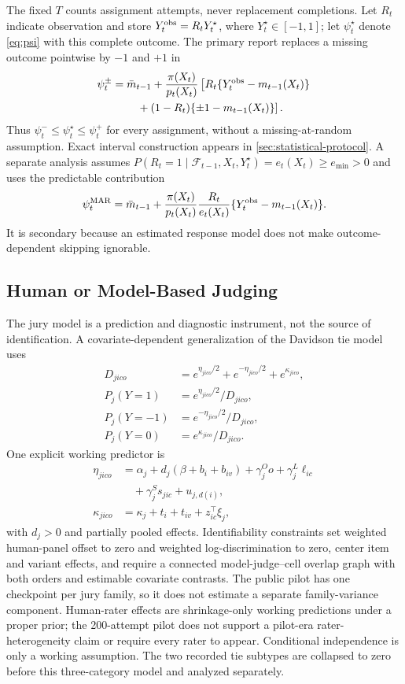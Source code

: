 \documentclass{article}
\begin{document}
The fixed $T$ counts assignment attempts, never replacement completions. Let
$R_t$ indicate observation and store $Y_t^{\rm obs}=R_tY_t^\star$, where
$Y_t^\star\in[-1,1]$; let $\psi_t^\star$ denote \cref{eq:psi} with this
complete outcome. The primary report replaces a missing outcome pointwise by
$-1$ and $+1$ in
\begin{align}
\psi_t^\pm
&=\bar m_{t-1}+\frac{\pi(X_t)}{p_t(X_t)}
\left[R_t\{Y_t^{\rm obs}-m_{t-1}(X_t)\}\right.\nonumber\\
&\qquad\left.{}+(1-R_t)\{\pm1-m_{t-1}(X_t)\}\right].
\end{align}
Thus $\psi_t^-\le\psi_t^\star\le\psi_t^+$ for every assignment, without a
missing-at-random assumption. Exact interval construction appears in
\cref{sec:statistical-protocol}. A separate analysis assumes
$P(R_t=1\mid\mathcal F_{t-1},X_t,Y_t^\star)=e_t(X_t)\ge e_{\min}>0$ and uses
the predictable contribution
\[
\psi_t^{\rm MAR}=\bar m_{t-1}+
\frac{\pi(X_t)}{p_t(X_t)}
\frac{R_t}{e_t(X_t)}
\{Y_t^{\rm obs}-m_{t-1}(X_t)\}.
\]
It is secondary because an estimated response model does not make
outcome-dependent skipping ignorable.

\subsection{Human or Model-Based Judging}

The jury model is a prediction and diagnostic instrument, not the source of
identification. A covariate-dependent generalization of the Davidson tie model
\cite{davidson1970ties} uses
\begin{align}
D_{jico}&=e^{\eta_{jico}/2}+e^{-\eta_{jico}/2}
+e^{\kappa_{jico}},\\
P_j(Y=1)&=e^{\eta_{jico}/2}/D_{jico},\\
P_j(Y=-1)&=e^{-\eta_{jico}/2}/D_{jico},\\
P_j(Y=0)&=e^{\kappa_{jico}}/D_{jico}.
\end{align}
One explicit working predictor is
\begin{align}
\eta_{jico}&=\alpha_j+d_j(\beta+b_i+b_{iv})
+\gamma_j^Oo+\gamma_j^L\ell_{ic}\nonumber\\
&\quad+\gamma_j^Ss_{jic}+u_{j,d(i)},\\
\kappa_{jico}&=\kappa_j+t_i+t_{iv}+z_{ic}^{\top}\xi_j,
\end{align}
with $d_j>0$ and partially pooled effects. Identifiability constraints set
weighted human-panel offset to zero and weighted log-discrimination to zero,
center item and variant effects, and require a connected model-judge--cell
overlap graph with both orders and estimable covariate contrasts. The public
pilot has one checkpoint per jury family, so it does not estimate a separate
family-variance component. Human-rater effects are shrinkage-only working
predictions under a proper prior; the 200-attempt pilot does not support a
pilot-era rater-heterogeneity claim or require every rater to appear.
Conditional independence is only a working assumption. The two recorded tie
subtypes are collapsed to zero before this three-category model and analyzed
separately.
\end{document}
